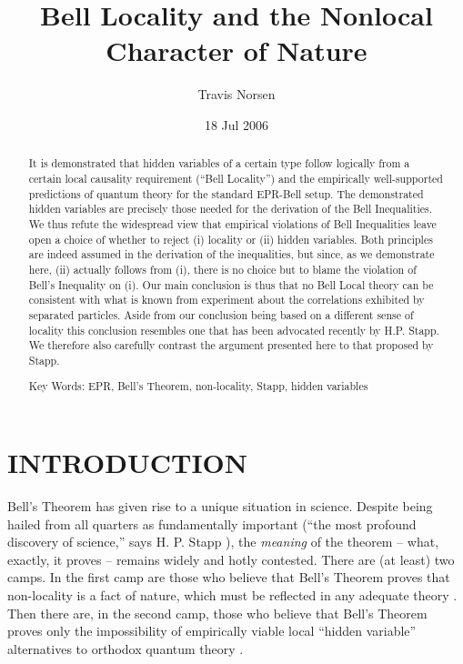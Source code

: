 \documentclass[aps,prc,onecolumn,12pt,nofootinbib]{revtex4-2}
\begin{document}
\title{Bell Locality and the Nonlocal Character of Nature}
\author{Travis Norsen}

\date{18 Jul 2006}

\begin{abstract}
It is demonstrated that hidden variables of a certain type
follow logically from a certain local causality requirement (``Bell Locality'')
and the empirically well-supported predictions of
quantum theory for the standard EPR-Bell setup.
The demonstrated hidden variables are precisely
those needed for the derivation of the Bell Inequalities.  We
thus refute the widespread view that empirical violations of Bell
Inequalities leave open a choice of whether to reject (i) locality or
(ii) hidden variables.  Both principles are indeed assumed in the
derivation of the inequalities, but since, as we demonstrate here,
(ii) actually follows from (i), there is no choice but to blame the
violation of Bell's Inequality on (i).  Our main conclusion is thus
that no Bell Local theory can be consistent with what is known from
experiment about the correlations exhibited by separated particles.
Aside from our conclusion being based on a different sense of locality
this conclusion
resembles one that has been advocated recently by H.P. Stapp.
We therefore also carefully contrast
the argument presented here to that proposed by Stapp.

\bigskip

Key Words:  EPR, Bell's Theorem, non-locality, Stapp, hidden variables

\end{abstract}

\maketitle

\newpage

\section{INTRODUCTION}
\label{sec1}

Bell's Theorem \cite{bell} has given rise to a unique situation in
science.
Despite being hailed from all quarters as fundamentally important
(``the most profound discovery of science,'' says H. P. Stapp
\cite{stappquote}),
the \emph{meaning} of the theorem -- what, exactly, it proves -- remains
widely and hotly contested.  There are (at least) two camps.  In the
first camp are those who believe
that Bell's Theorem proves that non-locality is a fact of nature,
which must be reflected in any adequate theory
\cite{bell,maudlin,shelly,norsen,wiseman}.
Then there are, in the second camp,
those who believe that Bell's Theorem proves only the impossibility of
empirically viable local ``hidden variable'' alternatives to orthodox
quantum theory \cite{wigner,merminquote}.
\end{document}
